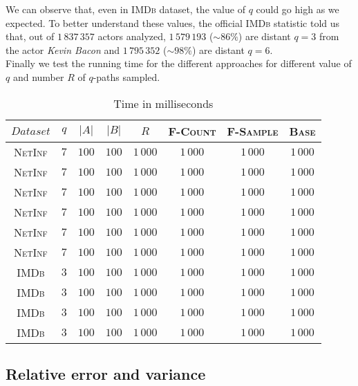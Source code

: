 	We can observe that, even in \textsc{IMDb} dataset, the value of $q$ could go high as we expected. To better understand these values, the official \textsc{IMDb} statistic told us that, out of $1\,837\,357$ actors analyzed, $1\,579\,193$ ($\sim86\%$) are distant $q=3$ from the actor \textit{Kevin Bacon} and $1\,795\,352$ ($\sim98\%$) are distant $q=6$.\\
	
	Finally we test the running time for the different approaches for different value of $q$ and number $R$ of $q$-paths sampled.
	
	\begin{table}[h]
		\centering
		\label{my-label}
		\begin{tabular}{|c|c|c|c|c|c|c|c|}
			\hline
			$Dataset$       & $q$  & $|A|$ & $|B|$ & $R$ & \textsc{F-Count} & \textsc{F-Sample} & \textsc{Base} \\ \hline
			\textsc{NetInf} & $7$  & $100$ & $100$ & $1\,000$ & $1\,000$ & $1\,000$ & $1\,000$ \\ \hline
			\textsc{NetInf} & $7$  & $100$ & $100$ & $1\,000$ & $1\,000$ & $1\,000$ & $1\,000$ \\ \hline
			\textsc{NetInf} & $7$  & $100$ & $100$ & $1\,000$ & $1\,000$ & $1\,000$ & $1\,000$ \\ \hline
			\textsc{NetInf} & $7$  & $100$ & $100$ & $1\,000$ & $1\,000$ & $1\,000$ & $1\,000$ \\ \hline
			\textsc{NetInf} & $7$  & $100$ & $100$ & $1\,000$ & $1\,000$ & $1\,000$ & $1\,000$ \\ \hline
			\textsc{NetInf} & $7$  & $100$ & $100$ & $1\,000$ & $1\,000$ & $1\,000$ & $1\,000$ \\ \hline
			\textsc{IMDb}   & $3$  & $100$ & $100$ & $1\,000$ & $1\,000$ & $1\,000$ & $1\,000$ \\ \hline
			\textsc{IMDb}   & $3$  & $100$ & $100$ & $1\,000$ & $1\,000$ & $1\,000$ & $1\,000$ \\ \hline
			\textsc{IMDb}   & $3$  & $100$ & $100$ & $1\,000$ & $1\,000$ & $1\,000$ & $1\,000$ \\ \hline
			\textsc{IMDb}   & $3$  & $100$ & $100$ & $1\,000$ & $1\,000$ & $1\,000$ & $1\,000$ \\ \hline
			
		\end{tabular}
		\caption{Time in milliseconds}
	\end{table}
	
	
	
	\subsection*{Relative error and variance}
	

